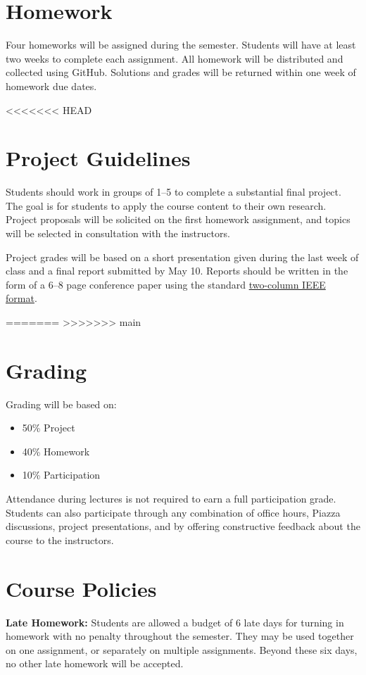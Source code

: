 \documentclass[11pt,letterpaper]{article}
\begin{document}
\section*{Homework}

Four homeworks will be assigned during the semester. Students will have at least two weeks to complete each assignment. All homework will be distributed and collected using GitHub. Solutions and grades will be returned within one week of homework due dates.

<<<<<<< HEAD
\section*{Project Guidelines}

Students should work in groups of 1--5 to complete a substantial final project. The goal is for students to apply the course content to their own research. Project proposals will be solicited on the first homework assignment, and topics will be selected in consultation with the instructors.

\medskip
\noindent
Project grades will be based on a short presentation given during the last week of class and a final report submitted by May 10. Reports should be written in the form of a 6--8 page conference paper using the standard \href{https://www.ieee.org/conferences/publishing/templates.html}{two-column IEEE format}.

=======
>>>>>>> main
\section*{Grading}

Grading will be based on:
\begin{itemize}
	\item 50\% Project
	\item 40\% Homework
	\item 10\% Participation
\end{itemize}
Attendance during lectures is not required to earn a full participation grade. Students can also participate through any combination of office hours, Piazza discussions, project presentations, and by offering constructive feedback about the course to the instructors.


\section*{Course Policies}

\textbf{Late Homework:} Students are allowed a budget of 6 late days for turning in homework with no penalty throughout the semester. They may be used together on one assignment, or separately on multiple assignments. Beyond these six days, no other late homework will be accepted.
\end{document}
